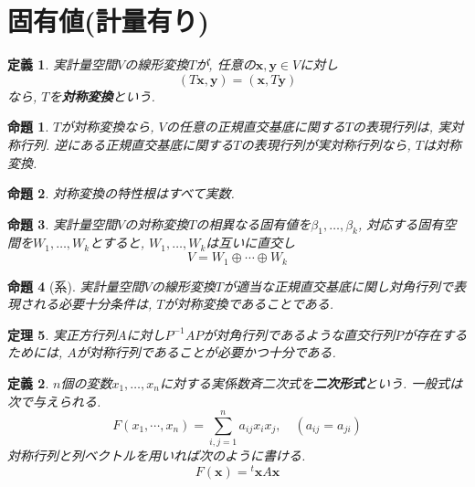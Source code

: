 \documentclass[a4j,dvipdfmx]{jsarticle}
\newcommand{\trans}{{}^t}
\theoremstyle{mystyle}
\newtheorem*{definition}{定義}
\newtheorem{theorem}{定理}[section]
\newtheorem{proposition}[theorem]{命題}
\begin{document}
\section{固有値(計量有り)}
    \begin{definition}
        実計量空間$V$の線形変換$T$が, 任意の$\bm{x},\bm{y}\in V$に対し
        \begin{equation*}
            (T\bm{x},\bm{y})=(\bm{x},T\bm{y})
        \end{equation*}
        なら, $T$を\textbf{対称変換}という.
    \end{definition}
    \begin{proposition}
        $T$が対称変換なら, $V$の任意の正規直交基底に関する$T$の表現行列は, 実対称行列. 逆にある正規直交基底に関する$T$の表現行列が実対称行列なら, $T$は対称変換.
    \end{proposition}
    \begin{proposition}
        対称変換の特性根はすべて実数.
    \end{proposition}
    \begin{proposition}
        実計量空間$V$の対称変換$T$の相異なる固有値を$\beta_1,\dots,\beta_k$, 対応する固有空間を$W_1,\dots,W_k$とすると, $W_1,\dots,W_k$は互いに直交し
        \begin{equation*}
            V=W_1\oplus\cdots\oplus W_k
        \end{equation*}
    \end{proposition}
    \begin{proposition}[系]
        実計量空間$V$の線形変換$T$が適当な正規直交基底に関し対角行列で表現される必要十分条件は, $T$が対称変換であることである.
    \end{proposition}
    \begin{theorem}
        実正方行列$A$に対し$P^{-1}AP$が対角行列であるような直交行列$P$が存在するためには, $A$が対称行列であることが必要かつ十分である.
    \end{theorem}
    \begin{definition}
        $n$個の変数$x_1,\dots,x_n$に対する実係数斉二次式を\textbf{二次形式}という. 一般式は次で与えられる.
        \begin{equation*}
            F(x_1,\cdots,x_n)=\sum_{i,j=1}^{n}a_{ij}x_ix_j,\quad (a_{ij}=a_{ji})
        \end{equation*}
        対称行列と列ベクトルを用いれば次のように書ける.
        \begin{equation*}
            F(\bm{x})=\trans\bm{x}A\bm{x}
        \end{equation*}
    \end{definition}
\end{document}
